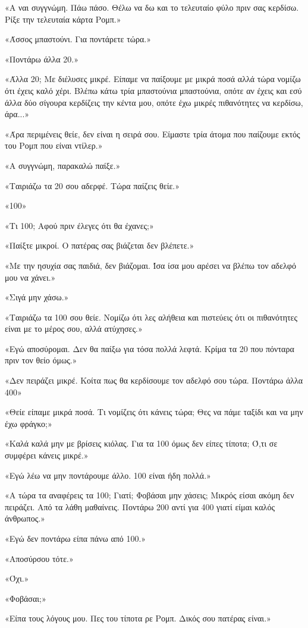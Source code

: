 \documentclass[12pt,twoside, openany]{book}
\begin{document}
«Α ναι συγγνώμη. Πάω πάσο. Θέλω να δω και το τελευταίο φύλο πριν σας κερδίσω. Ρίξε την τελευταία κάρτα Ρομπ.»

«Άσσος μπαστούνι. Για ποντάρετε τώρα.»

«Ποντάρω άλλα 20.»

«Άλλα 20; Με διέλυσες μικρέ. Είπαμε να παίξουμε με μικρά ποσά αλλά τώρα νομίζω ότι έχεις καλό χέρι. Βλέπω κάτω τρία μπαστούνια μπαστούνια, οπότε αν έχεις και εσύ άλλα δύο σίγουρα κερδίζεις την κέντα μου, οπότε έχω μικρές πιθανότητες να κερδίσω, άρα...»

«Άρα περιμένεις θείε, δεν είναι η σειρά σου. Είμαστε τρία άτομα που παίζουμε εκτός του Ρομπ που είναι ντίλερ.»

«Α συγγνώμη, παρακαλώ παίξε.»

«Ταιριάζω τα 20 σου αδερφέ. Τώρα παίζεις θείε.»

«100»

«Τι 100; Αφού πριν έλεγες ότι θα έχανες;»

«Παίξτε μικροί. Ο πατέρας σας βιάζεται δεν βλέπετε.»

«Με την ησυχία σας παιδιά, δεν βιάζομαι. Ίσα ίσα μου αρέσει να βλέπω τον αδελφό μου να χάνει.»

«Σιγά μην χάσω.»

«Ταιριάζω τα 100 σου θείε. Νομίζω ότι λες αλήθεια και πιστεύεις ότι οι πιθανότητες είναι με το μέρος σου, αλλά ατύχησες.»

«Εγώ αποσύρομαι. Δεν θα παίξω για τόσα πολλά λεφτά. Κρίμα τα 20 που πόνταρα πριν τον θείο όμως.»

«Δεν πειράζει μικρέ. Κοίτα πως θα κερδίσουμε τον αδελφό σου τώρα. Ποντάρω άλλα 400»

«Θείε είπαμε μικρά ποσά. Τι νομίζεις ότι κάνεις τώρα; Θες να πάμε ταξίδι και να μην έχω φράγκο;»

«Καλά καλά μην με βρίσεις κιόλας. Για τα 100 όμως δεν είπες τίποτα; Ό,τι σε συμφέρει κάνεις μικρέ.»

«Εγώ λέω να μην ποντάρουμε άλλο. 100 είναι ήδη πολλά.»

«Α τώρα τα αναφέρεις τα 100; Γιατί; Φοβάσαι μην χάσεις; Μικρός είσαι ακόμη δεν πειράζει. Από τα λάθη μαθαίνεις. Ποντάρω 200 αντί για 400 γιατί είμαι καλός άνθρωπος.»

«Εγώ δεν ποντάρω είπα πάνω από 100.»

«Αποσύρσου τότε.»

«Όχι.»

«Φοβάσαι;»

«Είπα τους λόγους μου. Πες του τίποτα ρε Ρομπ. Δικός σου πατέρας είναι.»
\end{document}
